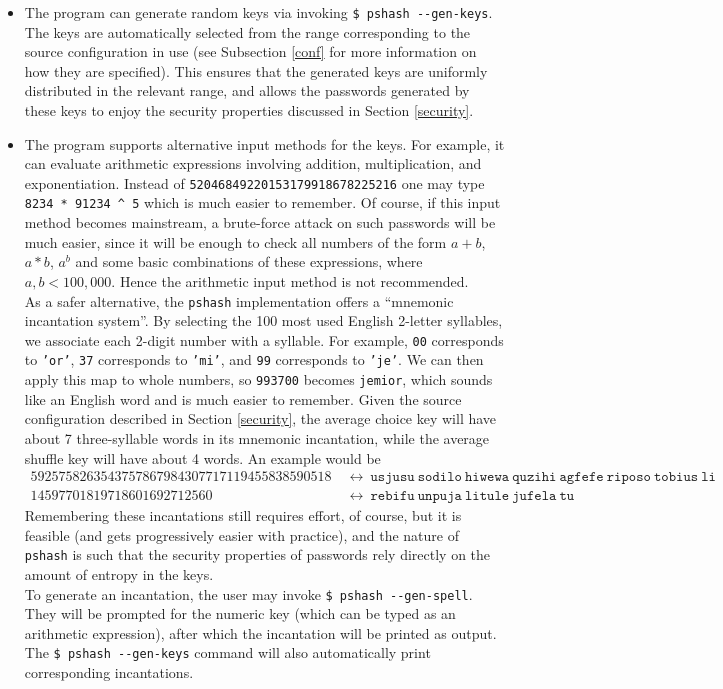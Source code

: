 \documentclass[a4paper, 10pt]{article}
\theoremstyle{plain}
\theoremstyle{definition}
\begin{document}
\begin{itemize}
  \item The program can generate random keys via invoking \verb|$ pshash --gen-keys|. The keys are automatically selected from the range corresponding to the source configuration in use (see Subsection \ref{conf} for more information on how they are specified). This ensures that the generated keys are uniformly distributed in the relevant range, and allows the passwords generated by these keys to enjoy the security properties discussed in Section \ref{security}.

  \item The program supports alternative input methods for the keys.
    For example, it can evaluate arithmetic expressions involving
    addition, multiplication, and exponentiation. Instead of
    \texttt{52046849220153179918678225216} one may type \texttt{8234 *
    91234 \^{} 5} which is much easier to remember. Of course, if this
    input method becomes mainstream, a brute-force attack on such
    passwords will be much easier, since it will be enough to check
    all numbers of the form $a + b$, $a * b$, $a ^ b$ and some basic
    combinations of these expressions, where $a,b < 100,000$. Hence
    the arithmetic input method is not recommended.\\
    As a safer alternative, the \texttt{pshash} implementation offers a ``mnemonic incantation system''. By selecting the 100 most used English 2-letter syllables, we associate each 2-digit number with a syllable. For example, \texttt{00} corresponds to \texttt{'or'}, \texttt{37} corresponds to \texttt{'mi'}, and \texttt{99} corresponds to \texttt{'je'}. We can then apply this map to whole numbers, so \texttt{993700} becomes \texttt{jemior}, which sounds like an English word and is much easier to remember. Given the source configuration described in Section \ref{security}, the average choice key will have about 7 three-syllable words in its mnemonic incantation, while the average shuffle key will have about 4 words. An example would be
    \begin{align*}
      5925758263543757867984307717119455838590518 \ &\longleftrightarrow \ \mathtt{usjusu\ sodilo\ hiwewa\ quzihi\ agfefe\ riposo\ tobius\ li}\\
      14597701819718601692712560 \ &\longleftrightarrow \ \mathtt{rebifu\ unpuja\ litule\ jufela\ tu}
    \end{align*}
    Remembering these incantations still requires effort, of course,
    but it is feasible (and gets progressively easier with practice), and the nature of \texttt{pshash} is such that the security properties of passwords rely directly on the amount of entropy in the keys.\\
    To generate an incantation, the user may invoke \verb|$ pshash --gen-spell|. They will be prompted for the numeric key (which can be typed as an arithmetic expression), after which the incantation will be printed as output. The \verb|$ pshash --gen-keys| command will also automatically print corresponding incantations.\\
\end{itemize}
\end{document}
